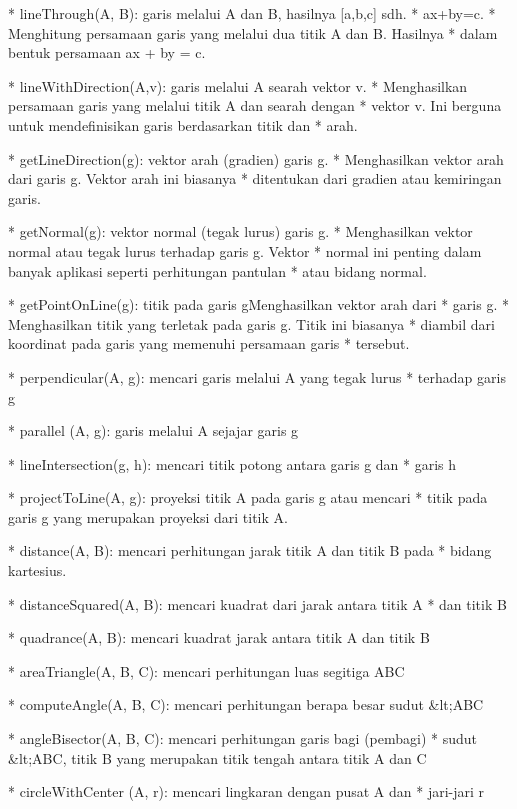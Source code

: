 \documentclass{article}
\begin{document}
* 
lineThrough(A, B): garis melalui A dan B, hasilnya [a,b,c] sdh.
* ax+by=c.
* Menghitung persamaan garis yang melalui dua titik A dan B. Hasilnya
* dalam bentuk persamaan ax + by = c.

* 
lineWithDirection(A,v): garis melalui A searah vektor v.
* Menghasilkan persamaan garis yang melalui titik A dan searah dengan
* vektor v. Ini berguna untuk mendefinisikan garis berdasarkan titik dan
* arah.

* 
getLineDirection(g): vektor arah (gradien) garis g.
* Menghasilkan vektor arah dari garis g. Vektor arah ini biasanya
* ditentukan dari gradien atau kemiringan garis.

* 
getNormal(g): vektor normal (tegak lurus) garis g.
* Menghasilkan vektor normal atau tegak lurus terhadap garis g. Vektor
* normal ini penting dalam banyak aplikasi seperti perhitungan pantulan
* atau bidang normal.

* 
getPointOnLine(g):  titik pada garis gMenghasilkan vektor arah dari
* garis g.
* Menghasilkan titik yang terletak pada garis g. Titik ini biasanya
* diambil dari koordinat pada garis yang memenuhi persamaan garis
* tersebut.

* 
perpendicular(A, g):  mencari garis melalui A yang tegak lurus
* terhadap garis g

* 
parallel (A, g):  garis melalui A sejajar garis g

* 
lineIntersection(g, h): mencari titik potong antara garis g dan
* garis h

* 
projectToLine(A, g):   proyeksi titik A pada garis g atau mencari
* titik pada garis g yang merupakan proyeksi dari titik A.

* 
distance(A, B):  mencari perhitungan jarak titik A dan titik B pada
* bidang kartesius.

* 
distanceSquared(A, B):  mencari kuadrat dari jarak antara titik A
* dan titik B

* 
quadrance(A, B): mencari kuadrat jarak antara titik A dan titik B

* 
areaTriangle(A, B, C): mencari perhitungan luas segitiga ABC

* 
computeAngle(A, B, C): mencari perhitungan berapa besar sudut &lt;ABC

* 
angleBisector(A, B, C): mencari perhitungan garis bagi (pembagi)
* sudut &lt;ABC, titik B yang merupakan titik tengah antara titik A dan C

* 
circleWithCenter (A, r): mencari lingkaran dengan pusat A dan
* jari-jari r
\end{document}
